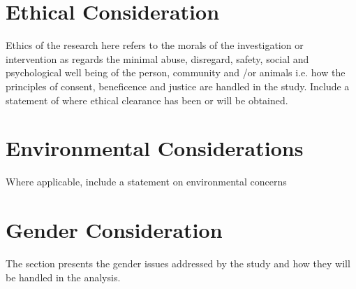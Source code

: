\section{Ethical Consideration}

Ethics of the research here refers to the morals of the investigation or intervention as
regards the minimal abuse, disregard, safety, social and psychological well being of the
person, community and /or animals i.e. how the principles of consent, beneficence and
justice are handled in the study. Include a statement of where ethical clearance has been or
will be obtained.

\section{Environmental Considerations}
Where applicable, include a statement on environmental concerns


\section{Gender Consideration}
The section presents the gender issues addressed by the study and how they will be
handled in the analysis.
